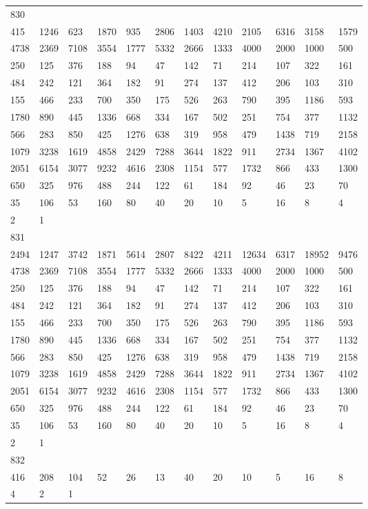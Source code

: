 \begin{longtable}{llllllllllll}
830&&&&&&&&&&&\\
415& 1246& 623& 1870& 935& 2806& 1403& 4210& 2105& 6316& 3158& 1579\\
4738& 2369& 7108& 3554& 1777& 5332& 2666& 1333& 4000& 2000& 1000& 500\\
250& 125& 376& 188& 94& 47& 142& 71& 214& 107& 322& 161\\
484& 242& 121& 364& 182& 91& 274& 137& 412& 206& 103& 310\\
155& 466& 233& 700& 350& 175& 526& 263& 790& 395& 1186& 593\\
1780& 890& 445& 1336& 668& 334& 167& 502& 251& 754& 377& 1132\\
566& 283& 850& 425& 1276& 638& 319& 958& 479& 1438& 719& 2158\\
1079& 3238& 1619& 4858& 2429& 7288& 3644& 1822& 911& 2734& 1367& 4102\\
2051& 6154& 3077& 9232& 4616& 2308& 1154& 577& 1732& 866& 433& 1300\\
650& 325& 976& 488& 244& 122& 61& 184& 92& 46& 23& 70\\
35& 106& 53& 160& 80& 40& 20& 10& 5& 16& 8& 4\\
2& 1& \\

831&&&&&&&&&&&\\
2494& 1247& 3742& 1871& 5614& 2807& 8422& 4211& 12634& 6317& 18952& 9476\\
4738& 2369& 7108& 3554& 1777& 5332& 2666& 1333& 4000& 2000& 1000& 500\\
250& 125& 376& 188& 94& 47& 142& 71& 214& 107& 322& 161\\
484& 242& 121& 364& 182& 91& 274& 137& 412& 206& 103& 310\\
155& 466& 233& 700& 350& 175& 526& 263& 790& 395& 1186& 593\\
1780& 890& 445& 1336& 668& 334& 167& 502& 251& 754& 377& 1132\\
566& 283& 850& 425& 1276& 638& 319& 958& 479& 1438& 719& 2158\\
1079& 3238& 1619& 4858& 2429& 7288& 3644& 1822& 911& 2734& 1367& 4102\\
2051& 6154& 3077& 9232& 4616& 2308& 1154& 577& 1732& 866& 433& 1300\\
650& 325& 976& 488& 244& 122& 61& 184& 92& 46& 23& 70\\
35& 106& 53& 160& 80& 40& 20& 10& 5& 16& 8& 4\\
2& 1& \\

832&&&&&&&&&&&\\
416& 208& 104& 52& 26& 13& 40& 20& 10& 5& 16& 8\\
4& 2& 1& \\


\end{longtable}
